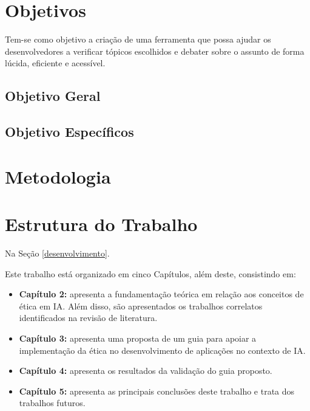 \section{Objetivos}
Tem-se como objetivo a criação de uma ferramenta que possa ajudar os desenvolvedores a verificar tópicos escolhidos e debater sobre o assunto de forma lúcida, eficiente e acessível.

\subsection{Objetivo Geral}

\subsection{Objetivo Específicos}

\section{Metodologia}

\section{Estrutura do Trabalho}
Na Seção \ref{desenvolvimento}.



Este trabalho está organizado em cinco Capítulos, além deste, consistindo em:
\begin{itemize}

    \item \textbf{Capítulo 2:} apresenta a fundamentação teórica em relação aos conceitos de ética em IA. Além disso, são apresentados os trabalhos correlatos identificados na revisão de literatura.

    \item \textbf{Capítulo 3:} apresenta uma proposta de um guia para apoiar a implementação da ética no desenvolvimento de aplicações no contexto de IA.

    \item \textbf{Capítulo 4:} apresenta os resultados da validação do guia proposto.

    \item \textbf{Capítulo 5:} apresenta as principais conclusões deste trabalho e trata dos trabalhos futuros.

\end{itemize}